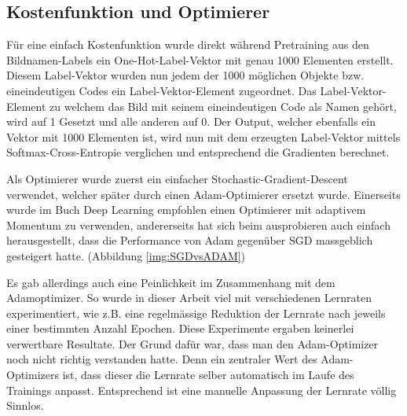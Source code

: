 \subsection{Kostenfunktion und Optimierer}
Für eine einfach Kostenfunktion wurde direkt während Pretraining aus den Bildnamen-Labels ein One-Hot-Label-Vektor mit genau 1000 Elementen erstellt.
Diesem Label-Vektor wurden nun jedem der 1000 möglichen Objekte bzw. eineindeutigen Codes ein Label-Vektor-Element zugeordnet. 
Das Label-Vektor-Element zu welchem das Bild mit seinem eineindeutigen Code als Namen gehört, wird auf 1 Gesetzt und alle anderen auf 0.
Der Output, welcher ebenfalls ein Vektor mit 1000 Elementen ist, wird nun mit dem erzeugten Label-Vektor mittels Softmax-Cross-Entropie verglichen und entsprechend die Gradienten berechnet. 

Als Optimierer wurde zuerst ein einfacher Stochastic-Gradient-Descent verwendet, welcher später durch einen Adam-Optimierer ersetzt wurde. 
Einerseits wurde im Buch Deep Learning \cite{deeplearning} empfohlen einen Optimierer mit adaptivem Momentum zu verwenden, andererseits hat sich beim ausprobieren auch einfach herausgestellt, dass die Performance von Adam gegenüber SGD massgeblich gesteigert hatte. (Abbildung \ref{img:SGDvsADAM})

Es gab allerdings auch eine Peinlichkeit im Zusammenhang mit dem Adamoptimizer.
So wurde in dieser Arbeit viel mit verschiedenen Lernraten experimentiert, wie z.B. eine regelmässige Reduktion der Lernrate nach jeweils einer bestimmten Anzahl Epochen.
Diese Experimente ergaben keinerlei verwertbare Resultate.
Der Grund dafür war, dass man den Adam-Optimizer noch nicht richtig verstanden hatte.
Denn ein zentraler Wert des Adam-Optimizers ist, dass dieser die Lernrate selber automatisch im Laufe des Trainings \grqq{}anpasst\grqq{}.
Entsprechend ist eine manuelle Anpassung der Lernrate völlig Sinnlos.

